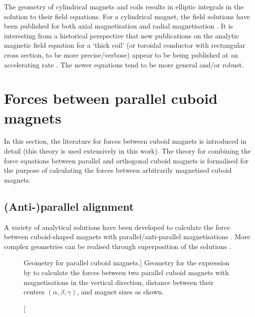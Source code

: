 \documentclass[11pt,a4paper]{memoir}
\begin{document}
The geometry of cylindrical magnets and coils results in elliptic integrals in the solution to their field equations.
For a cylindrical magnet, the field solutions have been published for both axial magnetisation \cite{ravaud2010-ietm} and radial magnetisation \cite{furlani1995-ietm}.
It is interesting from a historical perspective that new publications on the analytic magnetic field equation for a `thick coil' (or toroidal conductor with rectangular cross section, to be more precise/verbose) appear to be being published at an accelerating rate \cite{danilov1971-nim,urankar1982-ietm,babic1988-ietm,azzerboni1993-ietm,labinac2006-ajp,pechenkov2006-rndt,ravaud2010-emwaves,zhang2012-ietm}.
The newer equations tend to be more general and/or robust.



\section{Forces between parallel cuboid magnets}

In this section, the literature for forces between cuboid magnets is introduced in detail (this theory is used extensively in this work).
The theory for combining the force equations between parallel and orthogonal cuboid magnets is formalised for the purpose of calculating the forces between arbitrarily magnetised cuboid magnets.

\subsection{(Anti-)parallel alignment}

\def\e#1{e_#1}

A variety of analytical solutions have been developed to calculate the
force between cuboid-shaped magnets with parallel/anti-parallel
magnetisations \cite{akoun1984,nagaraj1988,bonisoli2006}. More complex
geometries can be realised through superposition of the solutions
\cite{bancel1999}.

\begin{figure}
  \caption
  [Geometry for parallel cuboid magnets.]
  {Geometry for the expression by \textcite{akoun1984} to
  calculate the forces between two parallel cuboid magnets with
  magnetisations in the vertical direction, distance between their centres
  $(\alpha,\beta,\gamma)$, and magnet sizes as shown.}
\end{figure}
\end{document}
